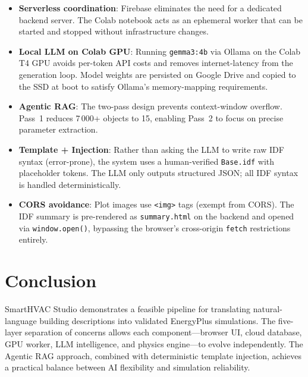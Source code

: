 \documentclass[12pt, a4paper]{article}
\begin{document}
\begin{itemize}[nosep]
  \item \textbf{Serverless coordination}: Firebase eliminates the need for a dedicated backend server. The Colab notebook acts as an ephemeral worker that can be started and stopped without infrastructure changes.
  \item \textbf{Local LLM on Colab GPU}: Running \texttt{gemma3:4b} via Ollama on the Colab T4 GPU avoids per-token API costs and removes internet-latency from the generation loop. Model weights are persisted on Google Drive and copied to the SSD at boot to satisfy Ollama's memory-mapping requirements.
  \item \textbf{Agentic RAG}: The two-pass design prevents context-window overflow. Pass~1 reduces 7\,000+ objects to 15, enabling Pass~2 to focus on precise parameter extraction.
  \item \textbf{Template + Injection}: Rather than asking the LLM to write raw IDF syntax (error-prone), the system uses a human-verified \texttt{Base.idf} with placeholder tokens. The LLM only outputs structured JSON; all IDF syntax is handled deterministically.
  \item \textbf{CORS avoidance}: Plot images use \texttt{<img>} tags (exempt from CORS). The IDF summary is pre-rendered as \texttt{summary.html} on the backend and opened via \texttt{window.open()}, bypassing the browser's cross-origin \texttt{fetch} restrictions entirely.
\end{itemize}

\section{Conclusion}

SmartHVAC Studio demonstrates a feasible pipeline for translating natural-language building descriptions into validated EnergyPlus simulations. The five-layer separation of concerns allows each component---browser UI, cloud database, GPU worker, LLM intelligence, and physics engine---to evolve independently. The Agentic RAG approach, combined with deterministic template injection, achieves a practical balance between AI flexibility and simulation reliability.
\end{document}
